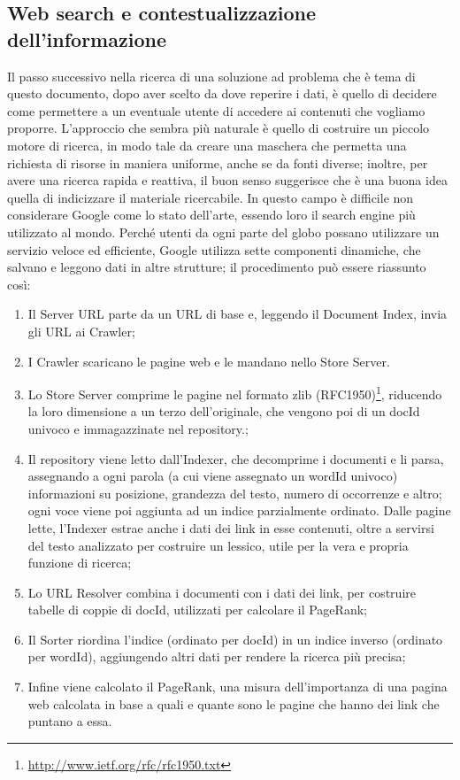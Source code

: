 \documentclass[sigproc-sp.tex]{subfiles}
\begin{document}
\subsection{Web search e contestualizzazione dell’informazione} 
Il passo successivo nella ricerca di una soluzione ad problema che è tema di questo documento, dopo aver scelto da dove reperire i dati, è quello di decidere come permettere a un eventuale utente di accedere ai contenuti che vogliamo proporre. L’approccio che sembra più naturale è quello di costruire un piccolo motore di ricerca, in modo tale da creare una maschera che permetta una richiesta di risorse in maniera uniforme, anche se da fonti diverse; inoltre, per avere una ricerca rapida e reattiva, il buon senso suggerisce che è una buona idea quella di indicizzare il materiale ricercabile.
In questo campo è difficile non considerare Google come lo stato dell’arte, essendo loro il search engine più utilizzato al mondo. Perché utenti da ogni parte del globo possano utilizzare un servizio veloce ed efficiente, Google utilizza sette componenti dinamiche, che salvano e leggono dati in altre strutture; il procedimento può essere riassunto così:
\begin{enumerate}
  \item Il Server URL parte da un URL di base e, leggendo il Document Index, invia gli URL ai Crawler;
  \item I Crawler scaricano le pagine web e le mandano nello Store Server.
  \item Lo Store Server comprime le pagine nel formato zlib (RFC1950)\footnote{\url{http://www.ietf.org/rfc/rfc1950.txt}}, riducendo la loro dimensione a un terzo dell’originale, che vengono poi di un docId univoco e immagazzinate nel repository.;
  \item Il repository viene letto dall’Indexer, che decomprime i documenti e li parsa, assegnando a ogni parola (a cui viene assegnato un wordId univoco) informazioni su posizione, grandezza del testo, numero di occorrenze e altro; ogni voce viene poi aggiunta ad un indice parzialmente ordinato. Dalle pagine lette, l’Indexer estrae anche i dati dei link in esse contenuti, oltre a servirsi del testo analizzato per costruire un lessico, utile per la vera e propria funzione di ricerca;
  \item Lo URL Resolver combina i documenti con i dati dei link, per costruire tabelle di coppie di docId, utilizzati per calcolare il PageRank;
  \item Il Sorter riordina l’indice (ordinato per docId) in un indice inverso (ordinato per wordId), aggiungendo altri dati per rendere la ricerca più precisa;
  \item Infine viene calcolato il PageRank, una misura dell’importanza di una pagina web calcolata in base a quali e quante sono le pagine che hanno dei link che puntano a essa.
\end{enumerate}
\end{document}
